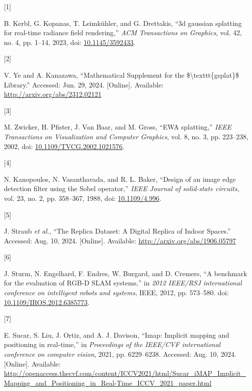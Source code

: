 \documentclass[twocolumn]{article} %
\newlength{\cslhangindent}
\newlength{\csllabelwidth}
\newenvironment{CSLReferences}[2] %
{\begin{list}{}{%
  \setlength{\itemindent}{0pt}
  \setlength{\leftmargin}{0pt}
  \setlength{\parsep}{0pt}
  \ifodd #1
  \setlength{\leftmargin}{\cslhangindent}
  \setlength{\itemindent}{-1\cslhangindent}
  \fi
  \setlength{\itemsep}{#2\baselineskip}}}
{\end{list}}
\newcommand{\CSLLeftMargin}[1]{\parbox[t]{\csllabelwidth}{\strut#1\strut}}
\newcommand{\CSLRightInline}[1]{\parbox[t]{\linewidth - \csllabelwidth}{\strut#1\strut}}
\begin{document}
\label{refs}
\begin{CSLReferences}{0}{0}
\CSLLeftMargin{{[}1{]} }%
\CSLRightInline{B. Kerbl, G. Kopanas, T. Leimkühler, and G. Drettakis,
{``3d gaussian splatting for real-time radiance field rendering,''}
\emph{ACM Transactions on Graphics}, vol. 42, no. 4, pp. 1--14, 2023,
doi: \href{https://doi.org/10.1145/3592433}{10.1145/3592433}.}

\CSLLeftMargin{{[}2{]} }%
\CSLRightInline{V. Ye and A. Kanazawa, {``Mathematical {Supplement} for
the \$\textbackslash texttt\{gsplat\}\$ {Library}.''} Accessed: Jun. 29,
2024. {[}Online{]}. Available: \url{http://arxiv.org/abs/2312.02121}}

\CSLLeftMargin{{[}3{]} }%
\CSLRightInline{M. Zwicker, H. Pfister, J. Van Baar, and M. Gross,
{``{EWA} splatting,''} \emph{IEEE Transactions on Visualization and
Computer Graphics}, vol. 8, no. 3, pp. 223--238, 2002, doi:
\href{https://doi.org/10.1109/TVCG.2002.1021576}{10.1109/TVCG.2002.1021576}.}

\CSLLeftMargin{{[}4{]} }%
\CSLRightInline{N. Kanopoulos, N. Vasanthavada, and R. L. Baker,
{``Design of an image edge detection filter using the {Sobel}
operator,''} \emph{IEEE Journal of solid-state circuits}, vol. 23, no.
2, pp. 358--367, 1988, doi:
\href{https://doi.org/10.1109/4.996}{10.1109/4.996}.}

\CSLLeftMargin{{[}5{]} }%
\CSLRightInline{J. Straub \emph{et al.}, {``The {Replica Dataset}: {A
Digital Replica} of {Indoor Spaces}.''} Accessed: Aug. 10, 2024.
{[}Online{]}. Available: \url{http://arxiv.org/abs/1906.05797}}

\CSLLeftMargin{{[}6{]} }%
\CSLRightInline{J. Sturm, N. Engelhard, F. Endres, W. Burgard, and D.
Cremers, {``A benchmark for the evaluation of {RGB-D SLAM} systems,''}
in \emph{2012 {IEEE}/{RSJ} international conference on intelligent
robots and systems}, IEEE, 2012, pp. 573--580. doi:
\href{https://doi.org/10.1109/IROS.2012.6385773}{10.1109/IROS.2012.6385773}.}

\CSLLeftMargin{{[}7{]} }%
\CSLRightInline{E. Sucar, S. Liu, J. Ortiz, and A. J. Davison, {``Imap:
{Implicit} mapping and positioning in real-time,''} in \emph{Proceedings
of the {IEEE}/{CVF} international conference on computer vision}, 2021,
pp. 6229--6238. Accessed: Aug. 10, 2024. {[}Online{]}. Available:
\url{http://openaccess.thecvf.com/content/ICCV2021/html/Sucar_iMAP_Implicit_Mapping_and_Positioning_in_Real-Time_ICCV_2021_paper.html}}

\end{CSLReferences}
\end{document}
